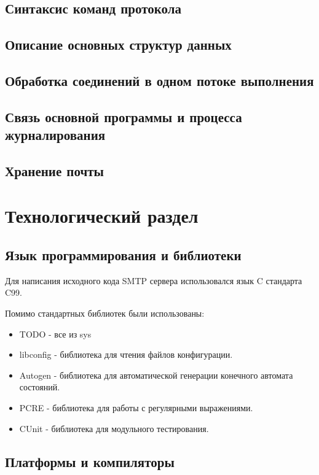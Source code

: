 \documentclass[a4paper,12pt]{report}
\begin{document}
\section{Синтаксис команд протокола}

\section{Описание основных структур данных}

\section{Обработка соединений в одном потоке выполнения}

\section{Связь основной программы и процесса журналирования}

\section{Хранение почты}

\chapter{Технологический раздел}

\section{Язык программирования и библиотеки}

Для написания исходного кода SMTP сервера использовался язык C стандарта C99.

Помимо стандартных библиотек были использованы:
\begin{itemize}
    \item TODO - все из sys 
    \item libconfig - библиотека для чтения файлов конфигурации.  
    \item Autogen - библиотека для автоматической генерации конечного автомата состояний.
    \item PCRE - библиотека для работы с регулярными выражениями. 
    \item CUnit - библиотека для модульного тестирования.
\end{itemize}


\section{Платформы и компиляторы}
\end{document}
